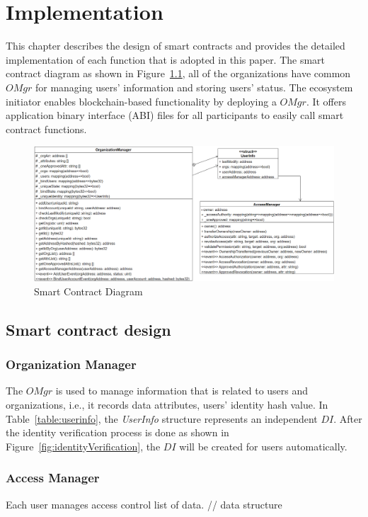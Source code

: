 \chapter{Implementation} 
\label{chapter:implementation}
This chapter describes the design of smart contracts and provides the detailed implementation of each function that is adopted in this paper. The smart contract diagram as shown in Figure~\ref{fig:smart_contract_diagram},  all of the organizations have common \(OMgr\) for managing users' information and storing users' status. The ecosystem initiator enables blockchain-based functionality by deploying a \(OMgr\). It offers application binary interface (ABI) files for all participants to easily call smart contract functions.

\begin{figure}[hb]
    \centering
    \includegraphics[height=!,width=1\linewidth,keepaspectratio=true]{figures/smart_contract_diagram.png}
    \caption{{\footnotesize Smart Contract Diagram}}
    \label{fig:smart_contract_diagram}
\end{figure}
\section{Smart contract design}
\subsection*{Organization Manager}
The \(OMgr\) is used to manage information that is related to users and organizations, i.e., it records data attributes, users' identity hash value. In Table~\ref{table:userinfo}, the \textit{UserInfo} structure represents an independent \(DI\). After the identity verification process is done as shown in Figure~\ref{fig:identityVerification}, the \(DI\) will be created for users automatically.




\subsection*{Access Manager}
Each user manages access control list of data.
// data structure

